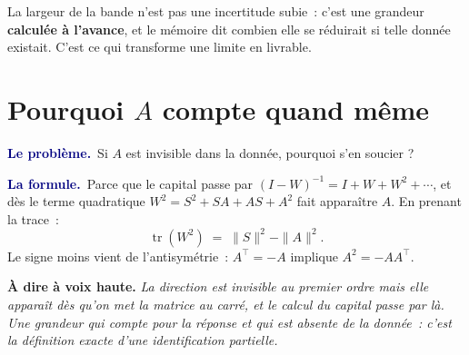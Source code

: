 \documentclass[11pt,a4paper]{article}
\newcommand{\lequoi}[1]{\smallskip\noindent\textcolor{navy}{\textbf{Le problème.}}\ #1\par}
\newcommand{\laformule}[1]{\smallskip\noindent\textcolor{navy}{\textbf{La formule.}}\ #1\par}
\newcommand{\laphrase}[1]{\begin{phrasebox}\textbf{À dire à voix haute.} \emph{#1}\end{phrasebox}}
\begin{document}
\begin{center}
\end{center}

\noindent La largeur de la bande n'est pas une incertitude subie~: c'est une grandeur
\textbf{calculée à l'avance}, et le mémoire dit combien elle se réduirait si telle donnée
existait. C'est ce qui transforme une limite en livrable.

\section{Pourquoi $A$ compte quand même}
\label{sec:trace}

\lequoi{Si $A$ est invisible dans la donnée, pourquoi s'en soucier ?}

\laformule{Parce que le capital passe par $(I-W)^{-1}=I+W+W^2+\cdots$, et dès le terme
quadratique $W^2=S^2+SA+AS+A^2$ fait apparaître $A$. En prenant la trace~:
\[
  \operatorname{tr}(W^2)\;=\;\|S\|^2-\|A\|^2 .
\]
Le signe moins vient de l'antisymétrie~: $A^{\top}=-A$ implique $A^2=-AA^{\top}$.}

\laphrase{La direction est invisible au premier ordre mais elle apparaît dès qu'on met la
matrice au carré, et le calcul du capital passe par là. Une grandeur qui compte pour la
réponse et qui est absente de la donnée~: c'est la définition exacte d'une identification
partielle.}
\end{document}

